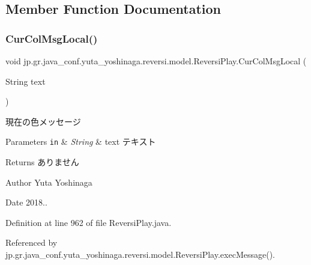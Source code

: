 \subsection{Member Function Documentation}
\mbox{\label{classjp_1_1gr_1_1java__conf_1_1yuta__yoshinaga_1_1reversi_1_1model_1_1_reversi_play_a0dec187d4c4372a3470fac8e341ae9e8}} 
\subsubsection{\texorpdfstring{Cur\+Col\+Msg\+Local()}{CurColMsgLocal()}}
{\footnotesize\ttfamily void jp.\+gr.\+java\+\_\+conf.\+yuta\+\_\+yoshinaga.\+reversi.\+model.\+Reversi\+Play.\+Cur\+Col\+Msg\+Local (\begin{DoxyParamCaption}\item[{String}]{text }\end{DoxyParamCaption})\hspace{0.3cm}{\ttfamily [private]}}



現在の色メッセージ 


\begin{DoxyParams}[1]{Parameters}
\mbox{\tt in}  & {\em String} & text テキスト \\
\hline
\end{DoxyParams}
\begin{DoxyReturn}{Returns}
ありません 
\end{DoxyReturn}
\begin{DoxyAuthor}{Author}
Yuta Yoshinaga 
\end{DoxyAuthor}
\begin{DoxyDate}{Date}
2018.. 
\end{DoxyDate}


Definition at line 962 of file Reversi\+Play.\+java.



Referenced by jp.\+gr.\+java\+\_\+conf.\+yuta\+\_\+yoshinaga.\+reversi.\+model.\+Reversi\+Play.\+exec\+Message().

